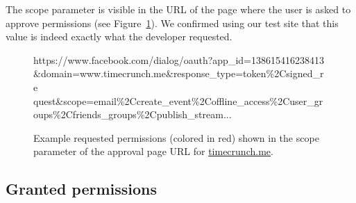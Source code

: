 \documentclass[10pt]{sig-alternate-10pt}
\begin{document}
The scope parameter is visible in the URL of the page where the user is asked to approve permissions (see Figure~\ref{figure:scopeinurl}).
We confirmed using our test site that this value is indeed exactly what the developer requested.

\begin{figure}[h!]
  {\small{\selectfont %
https://www.facebook.com/dialog/oauth?app\_id=138615416238413\\
\&domain=www.timecrunch.me\&response\_type=token\%2Csigned\_re\\
quest\&{\color{darkred}scope=email\%2Ccreate\_event\%2Coffline\_access\%2Cuser\_gr\\
oups\%2Cfriends\_groups\%2Cpublish\_stream}...}}
\caption{Example requested permissions (colored in red) shown in the scope parameter of the approval page URL for \url{timecrunch.me}.
  }
  \label{figure:scopeinurl}
\end{figure}
\subsection{Granted permissions}
\end{document}

